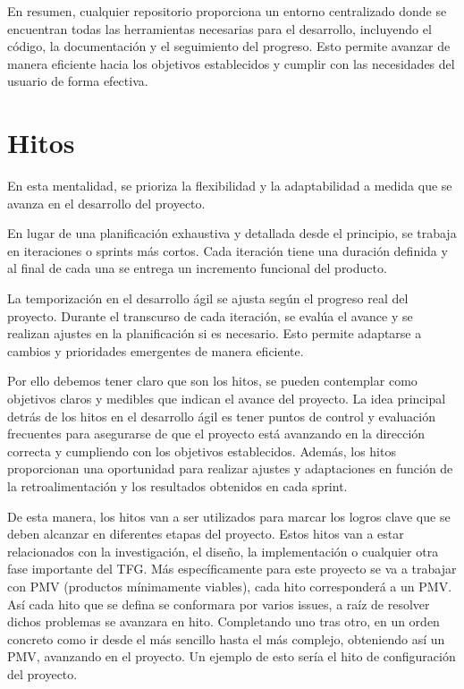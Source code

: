 En resumen, cualquier repositorio proporciona un entorno centralizado donde se encuentran todas las herramientas 
necesarias para el desarrollo, incluyendo el código, la documentación y el seguimiento del progreso. Esto permite avanzar de manera eficiente hacia los objetivos establecidos y cumplir con las necesidades del usuario de forma efectiva.

\section{Hitos}

En esta mentalidad, se prioriza la flexibilidad y la adaptabilidad a medida que se avanza en el desarrollo del proyecto.

En lugar de una planificación exhaustiva y detallada desde el principio, se trabaja en iteraciones o sprints más cortos. Cada iteración tiene una duración definida y al final de cada una se entrega un incremento funcional del producto.

La temporización en el desarrollo ágil se ajusta según el progreso real del proyecto. Durante el transcurso de cada iteración, se evalúa el avance y se realizan ajustes en la planificación si es necesario. Esto permite adaptarse a cambios y prioridades emergentes de manera eficiente.

Por ello debemos tener claro que son los hitos, se pueden contemplar como objetivos claros y medibles que indican el avance del proyecto. La idea principal detrás de los hitos en el desarrollo ágil es tener puntos de control y evaluación frecuentes para asegurarse de que el proyecto está avanzando en la dirección correcta y cumpliendo con los objetivos establecidos. Además, los hitos proporcionan una oportunidad para realizar ajustes y adaptaciones en función de la retroalimentación y los resultados obtenidos en cada sprint. 

De esta manera, los hitos van a ser utilizados para marcar los logros clave que se deben alcanzar en diferentes etapas del proyecto. Estos hitos van a estar relacionados con la investigación, el diseño, la implementación o cualquier otra fase importante del TFG. Más específicamente para este proyecto se va a trabajar con PMV (productos mínimamente viables), cada hito corresponderá a un PMV. Así cada hito que se defina se conformara por varios issues, a raíz de resolver dichos problemas se avanzara en hito. Completando uno tras otro, en un orden concreto como ir desde el más sencillo hasta el más complejo, obteniendo así un PMV, avanzando en el proyecto. Un ejemplo de esto sería el hito de configuración del proyecto.

